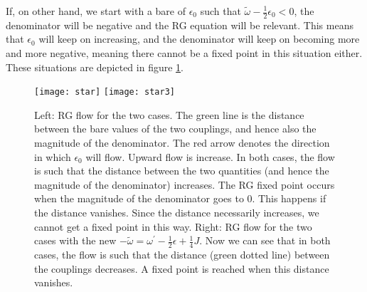 If, on other hand, we start with a bare of \(\epsilon_0\) such that \(\tilde \omega - \frac{1}{2}\epsilon_0 < 0\), the denominator will be negative and the RG equation will be relevant. This means that \(\epsilon_0\) will keep on increasing, and the denominator will keep on becoming more and more negative, meaning there cannot be a fixed point in this situation either. These situations are depicted in figure \ref{star1}.
\begin{figure}
	\centering
	\texttt{[image: star]}
	\hfill
	\vline
	\hfill
	\texttt{[image: star3]}
	\caption{Left: RG flow for the two cases. The green line is the distance between the bare values of the two couplings, and hence also the magnitude of the denominator. The red arrow denotes the direction in which \(\epsilon_0\) will flow. Upward flow is increase. In both cases, the flow is such that the distance between the two quantities (and hence the magnitude of the denominator) increases. The RG fixed point occurs when the magnitude of the denominator goes to 0. This happens if the distance vanishes. Since the distance necessarily increases, we cannot get a fixed point in this way. Right: RG flow for the two cases with the new \(-\tilde \omega = \omega^\prime - \frac{1}{2}\epsilon + \frac{1}{4}J\). Now we can see that in both cases, the flow is such that the distance (green dotted line) between the couplings decreases. A fixed point is reached when this distance vanishes.}
	\label{star1}
\end{figure}

